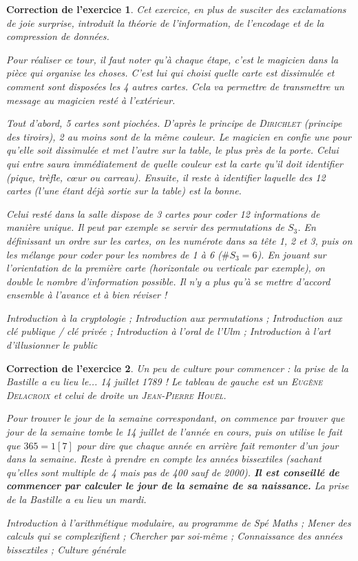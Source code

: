 \documentclass[12pt]{article}
\theoremstyle{break}
\newtheorem{cor}{Correction de l'exercice}
\begin{document}
\begin{cor}
\textit{Cet exercice, en plus de susciter des exclamations de joie surprise, introduit la théorie de l'information, de l'encodage et de la compression de données.}

Pour réaliser ce tour, il faut noter qu'à chaque étape, c'est le magicien dans la pièce qui organise les choses. C'est lui qui choisi quelle carte est dissimulée et comment sont disposées les 4 autres cartes. Cela va permettre de transmettre un message au magicien resté à l'extérieur.

Tout d'abord, 5 cartes sont piochées. D'après le principe de \textsc{Dirichlet} (principe des tiroirs), 2 au moins sont de la même couleur. Le magicien en confie une pour qu'elle soit dissimulée et met l'autre sur la table, le plus près de la porte. Celui qui entre saura immédiatement de quelle couleur est la carte qu'il doit identifier (pique, trèfle, cœur ou carreau). Ensuite, il reste à identifier laquelle des 12 cartes (l'une étant déjà sortie sur la table) est la bonne.

Celui resté dans la salle dispose de 3 cartes pour coder 12 informations de manière unique. Il peut par exemple se servir des permutations de $S_{3}$. En définissant un ordre sur les cartes, on les numérote dans sa tête 1, 2 et 3, puis on les mélange pour coder pour les nombres de 1 à 6 ($\#S_{3} = 6$). En jouant sur l'orientation de la première carte (horizontale ou verticale par exemple), on double le nombre d'information possible. Il n'y a plus qu'à se mettre d'accord ensemble à l'avance et à bien réviser !

\textit{Introduction à la cryptologie ; Introduction aux permutations ; Introduction aux clé publique / clé privée ; Introduction à l'oral de l'Ulm ; Introduction à l'art d'illusionner le public}
\end{cor}


\begin{cor}
Un peu de culture pour commencer : la prise de la Bastille a eu lieu le... 14 juillet 1789 ! Le tableau de gauche est un \textsc{Eugène Delacroix} et celui de droite un \textsc{Jean-Pierre Houël}.

Pour trouver le jour de la semaine correspondant, on commence par trouver que jour de la semaine tombe le 14 juillet de l'année en cours, puis on utilise le fait que $365 = 1 [7]$ pour dire que chaque année en arrière fait remonter d'un jour dans la semaine. Reste à prendre en compte les années bissextiles (sachant qu'elles sont multiple de 4 mais pas de 400 sauf de 2000). \textbf{Il est conseillé de commencer par calculer le jour de la semaine de sa naissance.} La prise de la Bastille a eu lieu un mardi.

\textit{Introduction à l'arithmétique modulaire, au programme de Spé Maths ; Mener des calculs qui se complexifient ; Chercher par soi-même ; Connaissance des années bissextiles ; Culture générale}
\end{cor}
\end{document}
